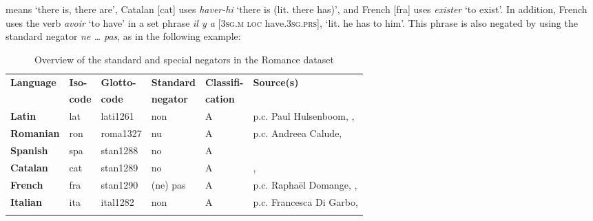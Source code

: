 \documentclass[output=paper]{langsci/langscibook}
\begin{document}
means `there is, there are', Catalan [cat] uses
\textit{haver-hi} `there is (lit. there has)', and French [fra]
uses \textit{exister} `to exist'. In addition, French uses the verb
\textit{avoir} `to have' in a set phrase \textit{il y a} [\textsc{3sg.m loc}
    have.\textsc{3sg.prs}], `lit. he has to him'. This phrase is also negated by using
the standard negator \textit{ne … pas}, as  in the following
example:
%
    \begin{exe}\end{exe}

\begin{table}\begin{small}
\caption{Overview of the standard and special negators in the Romance dataset}\label{tab:ieur-class-Romance}
\begin{tabularx}{\textwidth}{@{} l l l l l Q @{}}
\lsptoprule
\textbf{Language} & \textbf{Iso-} & \textbf{Glotto-} & \textbf{Standard} &
\textbf{Classifi-} & \textbf{Source(s)}\\
& \textbf{code} & \textbf{code} & \textbf{negator} & \textbf{cation} \\
\midrule
\textbf{Latin} & lat & lati1261 & non & A & p.c. Paul
Hulsenboom, \citet{GreenoughKittredge1903}, \textcite{Roby1862} \\
\midrule
\textbf{Romanian} & ron & roma1327 & nu & A & p.c. Andreea Calude, \citet{Gonczol2008} \\
\midrule
\textbf{Spanish} & spa & stan1288 & no & A & \citet{ButtBenjamin1994} \\
\midrule
\textbf{Catalan} & cat & stan1289 & no & A & \citet{Hualde1992},
\citet{WheelerYates1999} \\
\midrule
\textbf{French} & fra & stan1290 & (ne) pas & A & p.c. Raphaël Domange, \citet{LangPerez2004}, \citet{Offord2006} \\
\midrule
\textbf{Italian} & ita & ital1282 & non & A & p.c. Francesca Di Garbo, \citet{PeyronelHiggins2006} \\
\lspbottomrule
\end{tabularx}
\end{small}\end{table}
\end{document}
